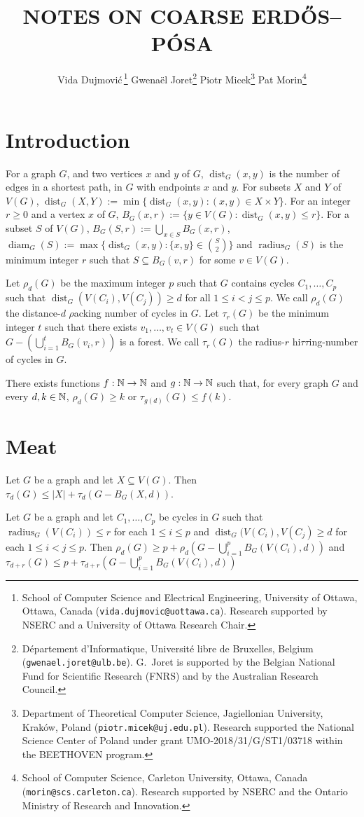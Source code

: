 \documentclass{patmorin}
\title{\MakeUppercase{Notes on Coarse {E}rdős–{P}ósa}}
\author{
 Vida Dujmovi{\'c}\,\footnote{School of Computer Science and Electrical Engineering, University of Ottawa, Ottawa, Canada (\texttt{vida.dujmovic@uottawa.ca}). Research supported by NSERC and a University of Ottawa Research Chair.}
 \qquad
 Gwena\"el Joret\footnote{D\'epartement d'Informatique, Universit\'e libre de Bruxelles, Belgium ({\tt gwenael.joret@ulb.be}). G.\ Joret is supported by the Belgian National Fund for Scientific Research (FNRS) and by the Australian Research Council.}
 \qquad
 Piotr Micek\footnote{Department of Theoretical Computer Science, Jagiellonian University, Kraków, Poland (\texttt{piotr.micek@uj.edu.pl}). Research supported
 the National Science Center of Poland under grant UMO-2018/31/G/ST1/03718 within the BEETHOVEN program.}
 \qquad
 Pat Morin\footnote{School of Computer Science, Carleton University, Ottawa, Canada (\texttt{morin@scs.carleton.ca}). Research supported by NSERC and the Ontario Ministry of Research and Innovation.}}
\date{}
\renewcommand{\ge}{\geqslant}
\renewcommand{\le}{\leqslant}
\DeclareMathOperator{\diam}{diam}
\DeclareMathOperator{\radius}{radius}
\DeclareMathOperator{\dist}{dist}
\begin{document}
\maketitle

\section{Introduction}


For a graph $G$, and two vertices $x$ and $y$ of $G$, $\dist_G(x,y)$ is the number of edges in a shortest path, in $G$ with endpoints $x$ and $y$.  For subsets $X$ and $Y$ of $V(G)$, $\dist_G(X,Y):=\min\{\dist_G(x,y):(x,y)\in X\times Y\}$.  For an integer $r\ge 0$ and a vertex $x$ of $G$, $B_G(x,r):=\{y\in V(G):\dist_G(x,y)\le r\}$.  For a subset $S$ of $V(G)$, $B_G(S,r):=\bigcup_{x\in S}B_G(x,r)$, $\diam_G(S):=\max\{\dist_G(x,y):\{x,y\}\in\binom{S}{2}\}$ and $\radius_G(S)$ is the minimum integer $r$ such that $S\subseteq B_G(v,r)$ for some $v\in V(G)$.

Let $\rho_d(G)$ be the maximum integer $p$ such that $G$ contains cycles $C_1,\ldots,C_p$ such that $\dist_G(V(C_i),V(C_j))\ge d$ for all $1\le i < j\le p$.  We call $\rho_d(G)$ the distance-$d$ $\rho$acking number of cycles in $G$.  Let $\tau_r(G)$ be the minimum integer $t$ such that there exists $v_1,\ldots,v_t\in V(G)$ such that $G-(\bigcup_{i=1}^t B_G(v_i,r))$ is a forest.  We call $\tau_r(G)$ the radius-$r$ hi$\tau\tau$ing-number of cycles in $G$.

\begin{conj}
  There exists functions $f:\mathbb{N}\to\mathbb{N}$ and $g:\mathbb{N}\to\mathbb{N}$ such that, for every graph $G$ and every $d,k\in\mathbb{N}$, $\rho_d(G) \ge k$ or $\tau_{g(d)}(G)\le f(k)$.
\end{conj}


\section{Meat}

\begin{obs}
  Let $G$ be a graph and let $X\subseteq V(G)$.  Then $\tau_d(G) \le |X| + \tau_d(G-B_G(X,d))$.
\end{obs}

\begin{lem}
  Let $G$ be a graph and let $C_1,\ldots,C_p$ be cycles in $G$ such that
  $\radius_G(V(C_i))\le r$ for each $1\le i\le p$ and
  $\dist_G(V(C_i),V(C_j)\ge d$ for each $1\le i<j\le p$.  Then $\rho_d(G)\ge p + \rho_d(G-\bigcup_{i=1}^p B_G(V(C_i),d))$ and
  $\tau_{d+r}(G) \le p + \tau_{d+r}(G-\bigcup_{i=1}^p B_G(V(C_i),d))$
\end{lem}
\end{document}
